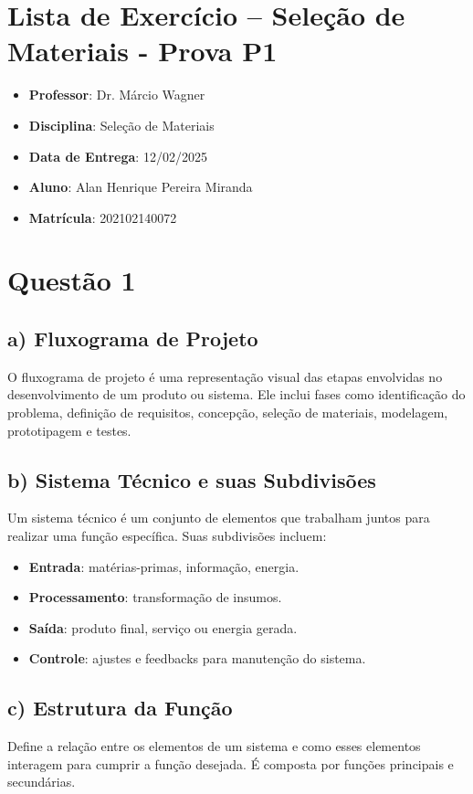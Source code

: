 
\section*{Lista de Exercício – Seleção de Materiais - Prova P1}

\begin{itemize}
    \item \textbf{Professor}: Dr. Márcio Wagner
    \item \textbf{Disciplina}: Seleção de Materiais
    \item \textbf{Data de Entrega}: 12/02/2025
    \item \textbf{Aluno}: Alan Henrique Pereira Miranda
    \item \textbf{Matrícula}: 202102140072
\end{itemize}

\section{Questão 1}
\subsection*{a) Fluxograma de Projeto}
O fluxograma de projeto é uma representação visual das etapas envolvidas no desenvolvimento de um produto ou sistema. Ele inclui fases como identificação do problema, definição de requisitos, concepção, seleção de materiais, modelagem, prototipagem e testes.

\subsection*{b) Sistema Técnico e suas Subdivisões}
Um sistema técnico é um conjunto de elementos que trabalham juntos para realizar uma função específica. Suas subdivisões incluem:
\begin{itemize}
    \item \textbf{Entrada}: matérias-primas, informação, energia.
    \item \textbf{Processamento}: transformação de insumos.
    \item \textbf{Saída}: produto final, serviço ou energia gerada.
    \item \textbf{Controle}: ajustes e feedbacks para manutenção do sistema.
\end{itemize}

\subsection*{c) Estrutura da Função}
Define a relação entre os elementos de um sistema e como esses elementos interagem para cumprir a função desejada. É composta por funções principais e secundárias.


